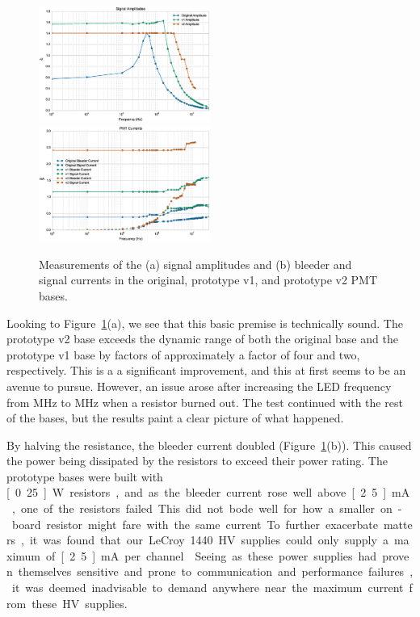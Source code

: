 \begin{figure}[h]
	\centerline{
		\mbox{\includegraphics[width=0.5\textwidth]{figures/Test_v2_Amp.eps} \includegraphics[width=0.5\textwidth]{figures/Test_v2_Current.eps}}}
	\caption{Measurements of the (a) signal amplitudes and (b) bleeder and signal currents in the original, prototype v1, and prototype v2 PMT bases.}
	\label{fig:test-v2}
\end{figure}

Looking to Figure~\ref{fig:test-v2}(a), we see that this basic premise is technically sound. The prototype v2 base exceeds the dynamic range of both the original base and the prototype v1 base by factors of approximately a factor of four and two, respectively. This is a a significant improvement, and this at first seems to be an avenue to pursue. However, an issue arose after increasing the LED frequency from \unit[13]{MHz} to \unit[14]{MHz} when a resistor burned out. The test continued with the rest of the bases, but the results paint a clear picture of what happened. 

By halving the resistance, the bleeder current doubled (Figure~\ref{fig:test-v2}(b)). This caused the power being dissipated by the resistors to exceed their power rating. The prototype bases were built with \unit[0.25]{W} resistors, and as the bleeder current rose well above \unit[2.5]{mA}, one of the resistors failed. This did not bode well for how a smaller on-board resistor might fare with the same current.

To further exacerbate matters, it was found that our LeCroy 1440 HV supplies could only supply a maximum of \unit[2.5]{mA} per channel~\cite{lecroy:1440}. Seeing as these power supplies had proven themselves sensitive and prone to communication and performance failures, it was deemed inadvisable to demand anywhere near the maximum current from these HV supplies.

